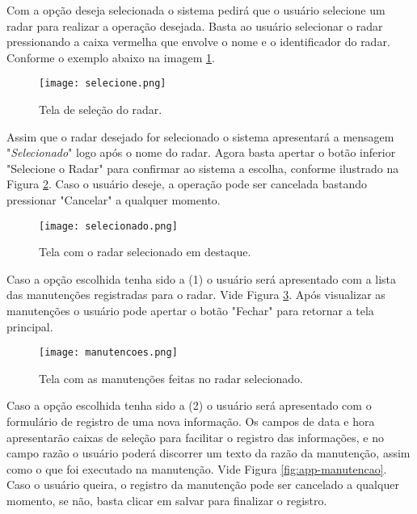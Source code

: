 Com a opção deseja selecionada o sistema pedirá que o usuário selecione um radar para realizar a operação desejada. Basta ao usuário selecionar o radar pressionando a caixa vermelha que envolve o nome e o identificador do radar. Conforme o exemplo abaixo na imagem \ref{fig:app-selecione}.
    
    \begin{figure}[H]
        \centering
        \texttt{[image: selecione.png]}
        \caption{Tela de seleção do radar.}
        \label{fig:app-selecione}
    \end{figure}

Assim que o radar desejado for selecionado o sistema apresentará a mensagem "\textit{Selecionado}" logo após o nome do radar. Agora basta apertar o botão inferior "Selecione o Radar" para confirmar ao sistema a escolha, conforme ilustrado na Figura \ref{fig:app-selecionado}. Caso o usuário deseje, a operação pode ser cancelada bastando pressionar "Cancelar" a qualquer momento.

    \begin{figure}[H]
        \centering
        \texttt{[image: selecionado.png]}
        \caption{Tela com o radar selecionado em destaque.}
        \label{fig:app-selecionado}
    \end{figure}

Caso a opção escolhida tenha sido a (1) o usuário será apresentado com a lista das manutenções registradas para o radar. Vide Figura \ref{fig:app-manutencoes}. Após visualizar as manutenções o usuário pode apertar o botão "Fechar" para retornar a tela principal.

    \begin{figure}[H]
        \centering
        \texttt{[image: manutencoes.png]}
        \caption{Tela com as manutenções feitas no radar selecionado.}
        \label{fig:app-manutencoes}
    \end{figure}

Caso a opção escolhida tenha sido a (2) o usuário será apresentado com o formulário de registro de uma nova informação. Os campos de data e hora apresentarão caixas de seleção para facilitar o registro das informações, e no campo razão o usuário poderá discorrer um texto da razão da manutenção, assim como o que foi executado na manutenção. Vide Figura \ref{fig:app-manutencao}. Caso o usuário queira, o registro da manutenção pode ser cancelado a qualquer momento, se não, basta clicar em salvar para finalizar o registro.
    
